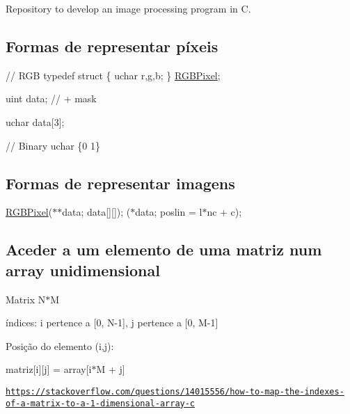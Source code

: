 Repository to develop an image processing program in C.

\subsection*{Formas de representar píxeis}


\begin{DoxyCode}
\textcolor{comment}{// RGB}
\textcolor{keyword}{typedef} \textcolor{keyword}{struct }\{
    uchar r,g,b;
\} \hyperlink{structRGBPixel}{RGBPixel};

uint data; \textcolor{comment}{// + mask}

uchar data[3];

\textcolor{comment}{// Binary}
uchar \{0 1\} 
\end{DoxyCode}


\subsection*{Formas de representar imagens}

\hyperlink{structRGBPixel}{R\+G\+B\+Pixel}($\ast$$\ast$data; data\mbox{[}\mbox{]}\mbox{[}\mbox{]}); ($\ast$data; poslin = l$\ast$nc + c);

\subsection*{Aceder a um elemento de uma matriz num array unidimensional}

Matrix N$\ast$M

índices\+: i pertence a \mbox{[}0, N-\/1\mbox{]}, j pertence a \mbox{[}0, M-\/1\mbox{]}

Posição do elemento (i,j)\+:

matriz\mbox{[}i\mbox{]}\mbox{[}j\mbox{]} = array\mbox{[}i$\ast$M + j\mbox{]}

\href{https://stackoverflow.com/questions/14015556/how-to-map-the-indexes-of-a-matrix-to-a-1-dimensional-array-c}{\tt https\+://stackoverflow.\+com/questions/14015556/how-\/to-\/map-\/the-\/indexes-\/of-\/a-\/matrix-\/to-\/a-\/1-\/dimensional-\/array-\/c} 